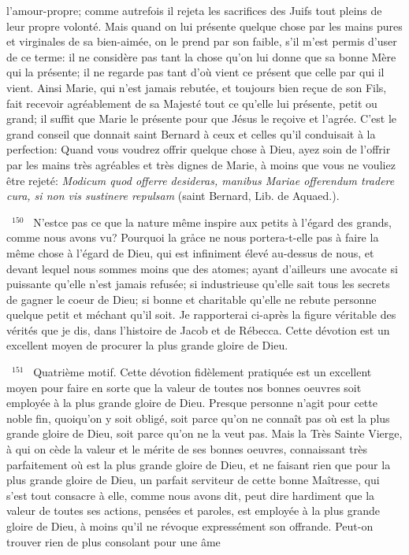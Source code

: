 \documentclass[paper=a5,pagesize=pdftex,fontsize=15pt,headinclude=on,twoside=off]{scrbook}
\newcommand{\negphantom}[1]{\settowidth{\dimen0}{#1}\hspace*{-\dimen0}}
\newcommand{\versenb}[1]{\par \vspace{10pt}~\negphantom{~${}^{#1}$~}${}^{#1}$~}
\newcommand{\latin}[1]{\emph{#1}}
\begin{document}
l'amour-propre; comme autrefois il rejeta les sacrifices des Juifs tout pleins de leur propre volonté. Mais quand on
lui présente quelque chose par les mains pures et virginales de sa bien-aimée, on le prend par son faible, s'il m'est
permis d'user de ce terme: il ne considère pas tant la chose qu'on lui donne que sa bonne Mère qui la présente; il
ne regarde pas tant d'où vient ce présent que celle par qui il vient. Ainsi Marie, qui n'est jamais rebutée, et toujours
bien reçue de son Fils, fait recevoir agréablement de sa Majesté tout ce qu'elle lui présente, petit ou grand; il suffit
que Marie le présente pour que Jésus le reçoive et l'agrée. C'est le grand conseil que donnait saint Bernard à ceux
et celles qu'il conduisait à la perfection: Quand vous voudrez offrir quelque chose à Dieu, ayez soin de l'offrir par
les mains très agréables et très dignes de Marie, à moins que vous ne vouliez être rejeté: \latin{Modicum quod offerre
desideras, manibus Mariae offerendum tradere cura, si non vis sustinere repulsam} (saint Bernard, Lib. de
Aquaed.).
\versenb{150} N'estce pas ce que la nature même inspire aux petits à l'égard des grands, comme nous avons vu? Pourquoi
la gråce ne nous portera-t-elle pas à faire la même chose à l'égard de Dieu, qui est infiniment élevé au-dessus de
nous, et devant lequel nous sommes moins que des atomes; ayant d'ailleurs une avocate si puissante qu'elle n'est
jamais refusée; si industrieuse qu'elle sait tous les secrets de gagner le coeur de Dieu; si bonne et charitable
qu'elle ne rebute personne quelque petit et méchant qu'il soit. Je rapporterai ci-après la figure véritable des vérités
que je dis, dans l'histoire de Jacob et de Rébecca.
Cette dévotion est un excellent moyen
de procurer la plus grande gloire de Dieu.
\versenb{151} Quatrième motif. Cette dévotion fidèlement pratiquée est un excellent moyen pour faire en sorte que la valeur
de toutes nos bonnes oeuvres soit employée à la plus grande gloire de Dieu. Presque personne n'agit pour cette
noble fin, quoiqu'on y soit obligé, soit parce qu'on ne connaît pas où est la plus grande gloire de Dieu, soit parce
qu'on ne la veut pas. Mais la Très Sainte Vierge, à qui on cède la valeur et le mérite de ses bonnes oeuvres,
connaissant très parfaitement où est la plus grande gloire de Dieu, et ne faisant rien que pour la plus grande gloire
de Dieu, un parfait serviteur de cette bonne Maîtresse, qui s'est tout consacre à elle, comme nous avons dit, peut
dire hardiment que la valeur de toutes ses actions, pensées et paroles, est employée à la plus grande gloire de
Dieu, à moins qu'il ne révoque expressément son offrande. Peut-on trouver rien de plus consolant pour une âme
\end{document}
